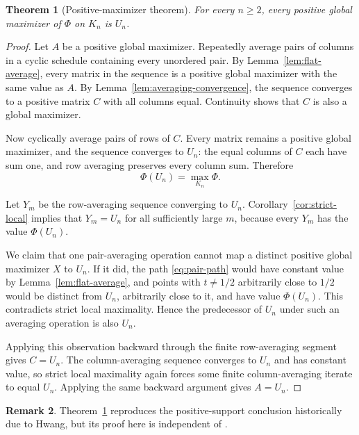 \documentclass[11pt,a4paper]{article}
\numberwithin{equation}{section}
\newtheorem{theorem}{Theorem}[section]
\theoremstyle{definition}
\newtheorem{remark}[theorem]{Remark}
\newcommand{\1}{\mathbf{1}}
\begin{document}
\begin{theorem}[Positive-maximizer theorem]\label{thm:positive-maximizer}
For every $n\ge2$, every positive global maximizer of $\Phi$ on $K_n$ is $U_n$.
\end{theorem}

\begin{proof}
Let $A$ be a positive global maximizer.  Repeatedly average pairs of columns in a cyclic schedule containing every unordered pair.  By Lemma~\ref{lem:flat-average}, every matrix in the sequence is a positive global maximizer with the same value as $A$.  By Lemma~\ref{lem:averaging-convergence}, the sequence converges to a positive matrix $C$ with all columns equal.  Continuity shows that $C$ is also a global maximizer.

Now cyclically average pairs of rows of $C$.  Every matrix remains a positive global maximizer, and the sequence converges to $U_n$: the equal columns of $C$ each have sum one, and row averaging preserves every column sum.  Therefore
\begin{equation}\label{eq:U-global}
 \Phi(U_n)=\max_{K_n}\Phi.
\end{equation}

Let $Y_m$ be the row-averaging sequence converging to $U_n$.  Corollary~\ref{cor:strict-local} implies that $Y_m=U_n$ for all sufficiently large $m$, because every $Y_m$ has the value $\Phi(U_n)$.

We claim that one pair-averaging operation cannot map a distinct positive global maximizer $X$ to $U_n$.  If it did, the path \eqref{eq:pair-path} would have constant value by Lemma~\ref{lem:flat-average}, and points with $t\ne1/2$ arbitrarily close to $1/2$ would be distinct from $U_n$, arbitrarily close to it, and have value $\Phi(U_n)$.  This contradicts strict local maximality.  Hence the predecessor of $U_n$ under such an averaging operation is also $U_n$.

Applying this observation backward through the finite row-averaging segment gives $C=U_n$.  The column-averaging sequence converges to $U_n$ and has constant value, so strict local maximality again forces some finite column-averaging iterate to equal $U_n$.  Applying the same backward argument gives $A=U_n$.
\end{proof}

\begin{remark}
Theorem~\ref{thm:positive-maximizer} reproduces the positive-support conclusion historically due to Hwang, but its proof here is independent of \cite{Hwang1986}.
\end{remark}
\end{document}

